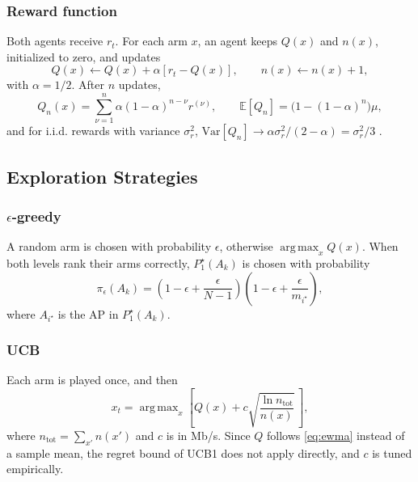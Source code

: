 \documentclass[journal]{IEEEtran}
\DeclareMathOperator*{\argmax}{arg\,max}
\theoremstyle{definition}
\theoremstyle{remark}
\theoremstyle{plain}
\begin{document}
\subsubsection{Reward function}
Both agents receive $r_t$. For each arm $x$, an agent keeps $Q(x)$ and $n(x)$, initialized to zero, and updates
\begin{equation}\label{eq:update}
Q(x)\leftarrow Q(x)+\alpha\left[r_t-Q(x)\right],\qquad n(x)\leftarrow n(x)+1,
\end{equation}
with $\alpha=1/2$. After $n$ updates,
\begin{equation}\label{eq:ewma}
Q_n(x)=\sum_{\nu=1}^{n}\alpha(1-\alpha)^{n-\nu}r^{(\nu)},\qquad \mathbb{E}[Q_n]=\big(1-(1-\alpha)^n\big)\mu,
\end{equation}
and for i.i.d. rewards with variance $\sigma_r^2$, $\mathrm{Var}[Q_n]\to\alpha\sigma_r^2/(2-\alpha)=\sigma_r^2/3$ \cite{sutton2018reinforcement}.

\subsection{Exploration Strategies}
\subsubsection{$\epsilon$-greedy}
A random arm is chosen with probability $\epsilon$, otherwise $\argmax_x Q(x)$. When both levels rank their arms correctly, $P_1^\star(A_k)$ is chosen with probability
\begin{equation}\label{eq:pieps}
\pi_\epsilon(A_k)=\left(1-\epsilon+\frac{\epsilon}{N-1}\right)\left(1-\epsilon+\frac{\epsilon}{m_{i^\star}}\right),
\end{equation}
where $A_{i^\star}$ is the AP in $P_1^\star(A_k)$.

\subsubsection{UCB}
Each arm is played once, and then
\begin{equation}\label{eq:ucb}
x_t=\argmax_{x}\left[Q(x)+c\sqrt{\frac{\ln n_{\mathrm{tot}}}{n(x)}}\,\right],
\end{equation}
where $n_{\mathrm{tot}}=\sum_{x'}n(x')$ and $c$ is in Mb/s. Since $Q$ follows \eqref{eq:ewma} instead of a sample mean, the regret bound of UCB1 \cite{auer2002finite} does not apply directly, and $c$ is tuned empirically.
\end{document}
